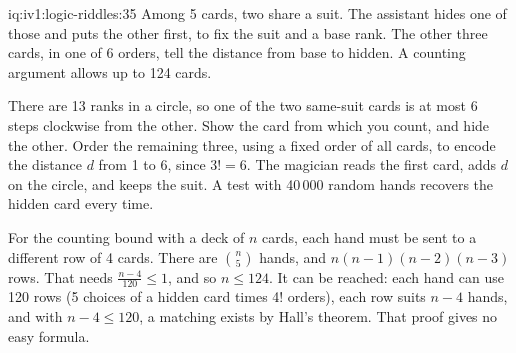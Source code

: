 \begin{solution}{iq:iv1:logic-riddles:35}
Among 5 cards, two share a suit. The assistant hides one of those and puts the other first, to fix the suit and a base rank. The other three cards, in one of 6 orders, tell the distance from base to hidden. A counting argument allows up to 124 cards.

There are 13 ranks in a circle, so one of the two same-suit cards is at most 6 steps clockwise from the other. Show the card from which you count, and hide the other. Order the remaining three, using a fixed order of all cards, to encode the distance $d$ from 1 to 6, since $3! = 6$. The magician reads the first card, adds $d$ on the circle, and keeps the suit. A test with 40\,000 random hands recovers the hidden card every time.

For the counting bound with a deck of $n$ cards, each hand must be sent to a different row of 4 cards. There are $\binom{n}{5}$ hands, and $n(n - 1)(n - 2)(n - 3)$ rows. That needs $\frac{n - 4}{120} \le 1$, and so $n \le 124$. It can be reached: each hand can use 120 rows (5 choices of a hidden card times 4! orders), each row suits $n - 4$ hands, and with $n - 4 \le 120$, a matching exists by Hall's theorem. That proof gives no easy formula.

\end{solution}
